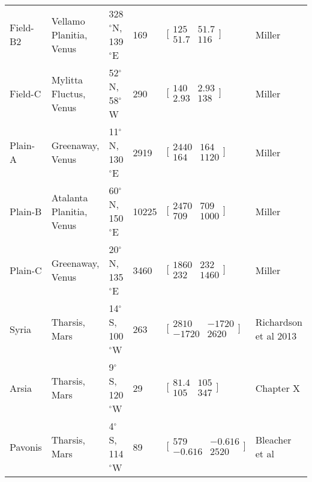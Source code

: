 \documentclass[12pt,letter]{article}
\begin{document}
\begin{table}
\begin{tabular}{p{2cm} p{2.5cm} p{2cm} l l p{3.5cm}}
Field-B2	&	Vellamo Planitia, Venus	&	328$^{\circ}$N, 139$^{\circ}$E	&	169	&	$\bigl[\begin{smallmatrix} 125&51.7\\51.7&116 \end{smallmatrix}\bigr]$	&	Miller\\
Field-C	&	Mylitta Fluctus, Venus	&	52$^{\circ}$N, 58$^{\circ}$W	&	290	&	$\bigl[\begin{smallmatrix} 140&2.93\\2.93&138 \end{smallmatrix}\bigr]$	&	Miller\\
Plain-A	&	Greenaway, Venus	&	11$^{\circ}$N, 130$^{\circ}$E	&	2919	&	$\bigl[\begin{smallmatrix} 2440&164\\164&1120 \end{smallmatrix}\bigr]$	&	Miller\\
Plain-B	&	Atalanta Planitia, Venus	&	60$^{\circ}$N, 150$^{\circ}$E	&	10225	&	$\bigl[\begin{smallmatrix} 2470&709\\709&1000 \end{smallmatrix}\bigr]$	&	Miller\\
Plain-C	&	Greenaway, Venus	&	20$^{\circ}$N, 135$^{\circ}$E	&	3460	&	$\bigl[\begin{smallmatrix} 1860&232\\232&1460 \end{smallmatrix}\bigr]$	&	Miller\\
Syria		&	Tharsis, Mars	&	14$^{\circ}$S, 100$^{\circ}$W	&	263	&	$\bigl[\begin{smallmatrix} 2810&-1720\\-1720&2620 \end{smallmatrix}\bigr]$	&	Richardson et al 2013\\
Arsia		&	Tharsis, Mars	&	9$^{\circ}$S, 120$^{\circ}$W	&	29	&	$\bigl[\begin{smallmatrix} 81.4&105\\105&347 \end{smallmatrix}\bigr]$	&	Chapter X\\
Pavonis	&	Tharsis, Mars	&	4$^{\circ}$S, 114$^{\circ}$W	&	89	&	$\bigl[\begin{smallmatrix} 579&-0.616\\-0.616&2520 \end{smallmatrix}\bigr]$	&	Bleacher et al\\
\bottomrule
\end{tabular}
\end{table}
\end{document}
